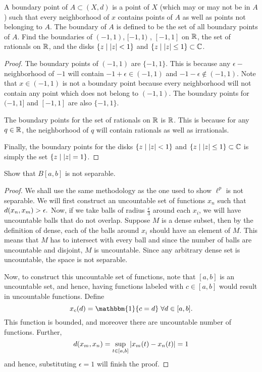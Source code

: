 \begin{question}
    A boundary point of $A \subset (X,d)$ is a point of $X$ (which may or may not be in $A$) such that every neighborhood of $x$ contains points of $A$ as well as points not belonging to $A$. The boundary of $A$ is defined to be the set of all boundary points of $A$. Find the boundaries of $(-1,1)$, $[-1,1)$ , $[-1,1]$ on $\mathbb{R}$, the set of rationals on $\mathbb{R}$, and the disks $\{z \mid \left\lvert z \right\rvert < 1\}$ and $\{z \mid \left\lvert z \right\rvert \leq 1\} \subset \mathbb{C}$.
\label{section1.3-11}
\end{question}
\begin{proof}
    The boundary points of $(-1,1)$ are $\{-1,1\}.$ This is because any $\epsilon-$neighborhood of $-1$ will contain $-1+\epsilon \in (-1,1)$ and $-1-\epsilon \notin (-1,1)$. Note that $x \in (-1,1)$ is not a boundary point because every neighborhood will not contain any point which does not belong to $(-1,1)$. The boundary points for $(-1,1]$ and $[-1,1]$ are also $\{-1,1\}$.

    The boundary points for the set of rationals on $\mathbb{R}$ is $\mathbb{R}$. This is because for any $q \in \mathbb{R}$, the neighborhood of $q$ will contain rationals as well as irrationals. 

    Finally, the boundary points for the disks $\{z \mid \left\lvert z \right\rvert < 1\}$ and $\{z \mid \left\lvert z \right\rvert \leq 1\} \subset \mathbb{C}$ is simply the set $\{z \mid \left\lvert z \right\rvert = 1\}$.
\end{proof}

\begin{question}
    Show that $B[a,b]$ is not separable.
    \label{section1.3-12}
\end{question}
\begin{proof}
    We shall use the same methodology as the one used to show $\ell^p$ is not separable. We will first construct an uncountable set of functions $x_n$ such that $d(x_n , x_m) > \epsilon.$ Now, if we take balls of radius $\frac{\epsilon}{3}$ around each $x_i$, we will have uncountable balls that do not overlap. Suppose $M$ is a dense subset, then by the definition of dense, each of the balls around $x_i$ should have an element of $M$. This means that $M$ has to intersect with every ball and since the number of balls are uncountable and disjoint, $M$ is uncountable. Since any arbitrary dense set is uncountable, the space is not separable.

    Now, to construct this uncountable set of functions, note that $[a,b]$ is an uncountable set, and hence, having functions labeled with $c \in [a,b]$ would result in uncountable functions. Define 
    \[x_c(d) = \mathbbm{1}\{c=d\} \; \forall d \in [a,b].\]
    This function is bounded, and moreover there are uncountable number of functions. Further, 
    \[d(x_m , x_n) = \sup_{t \in [a,b]} \left\lvert x_m(t) - 
    x_n(t) \right\rvert = 1\]
    and hence, substituting $\epsilon = 1$ will finish the proof.
\end{proof} 

